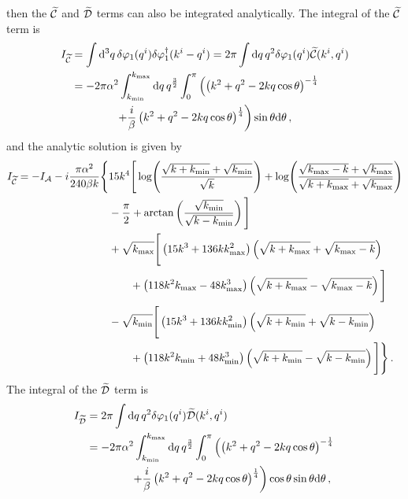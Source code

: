 % 
then the $\widetilde{\mathcal{C}}$ and $\widetilde{\mathcal{D}}$ terms can also be integrated analytically.
The integral of the $\widetilde{\mathcal{C}}$ term is 
% 
\begin{align}
 \label{eq:cint-num}
I_{\wt{\C}} &= \int\d^3 q\, \dvp1(\qvi) \dN{\dvp1}(\kvi-\qvi) 
    = 2\pi \int \d q\, q^2 \dvp1(\qvi) \wt{\C}(\kvi, \qvi) \nonumber\\
% 
 &= -2\pi\alpha^2 \int_{\kmin}^{\kmax} \d q\, q^{\frac{3}{2}} \int_0^\pi 
     \left( \left(k^2 + q^2 -2kq \cos\theta\right)^{-\frac{1}{4}} \right.\nonumber \\
            &\qquad \qquad \left.+\frac{i}{\beta}\left(k^2 + q^2 -2kq
\cos\theta\right)^{\frac{1}{4}}
	\right) \sin\theta \d \theta\,,
\end{align}
% 
and the analytic solution is given by
% 
\begin{align}
\label{eq:cint-soln-num}
I_{\wt{\C}} = -I_\A -i\frac{\pi\alpha^2}{240 \beta k}\Bigg\{ 
	&15 k^4 \Bigg[ \log\Biggl(\frac{\sqrt{k+\kmin} + \sqrt{\kmin}}{\sqrt{k}}
			    \Biggr)
	 + \log\Biggl( \frac{\sqrt{\kmax-k} + \sqrt{\kmax}}{\sqrt{k+\kmax}
			+\sqrt{\kmax}}\Biggr) \nonumber \\
	&-\frac{\pi}{2} + \arctan\left( \frac{\sqrt{\kmin}}{\sqrt{k-\kmin}}\right)
	\Bigg] \nonumber\\
% 
        &+\sqrt{\kmax}\Bigg[ \left(15k^3 + 136k\kmax^2 \right)\left(\sqrt{k+\kmax} +
	  \sqrt{\kmax-k}\right) \nonumber \\
	&\qquad +\left(118k^2\kmax -48\kmax^3\right) \left(\sqrt{k+\kmax} -
         \sqrt{\kmax -k} \right) \Bigg] \nonumber \\
% 
	&-\sqrt{\kmin}\Bigg[ \left(15k^3 + 136k\kmin^2 \right)\left(\sqrt{k+\kmin} +
	  \sqrt{k-\kmin}\right) \nonumber \\
	&\qquad +\left(118k^2\kmin +48\kmin^3\right) \left(\sqrt{k+\kmin} -
         \sqrt{k-\kmin} \right) \Bigg] \Bigg\} \,.
\end{align}
The integral of the $\widetilde{\mathcal{D}}$ term is 
% 
\begin{align}
 \label{eq:dint-num}
I_{\wt{\D}} &= 2\pi \int \d q\, q^2 \dvp1(\qvi) \wt{\D}(\kvi, \qvi) \\
% 
 &= -2\pi\alpha^2 \int_{\kmin}^{\kmax} \d q\, q^{\frac{3}{2}} \int_0^\pi 
     \left( \left(k^2 + q^2 -2kq \cos\theta\right)^{-\frac{1}{4}} \right.\nonumber\\
% 
        &\qquad\qquad\left.+\frac{i}{\beta}\left(k^2 + q^2 -2kq
\cos\theta\right)^{\frac{1}{4}}
	\right) \cos\theta\sin\theta \d \theta\,,
\end{align}
